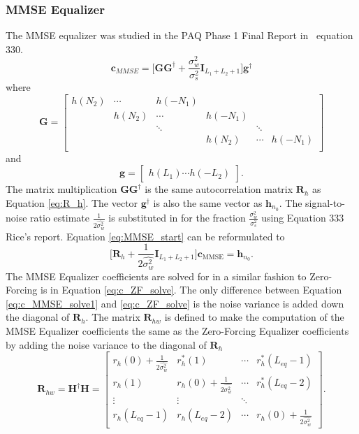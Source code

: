 \subsubsection{MMSE Equalizer}
The MMSE equalizer was studied in the PAQ Phase 1 Final Report in ~equation 330.
\begin{equation}
\mathbf{c}_{MMSE} = \big[ \mathbf{G}\mathbf{G}^\dagger + \frac{\sigma_w^2}{\sigma_s^2}\mathbf{I}_{L_1+L_2+1} \big] \mathbf{g}^\dagger
\label{eq:MMSE_start}
\end{equation}
where
\begin{equation}
\mathbf{G} = 
		\begin{bmatrix}
		h(N_2)		& \cdots	& h(-N_1) 	&  			\\
					& h(N_2)	& \cdots 	& h(-N_1)	\\
				 	& 			& \ddots 	&  			& \ddots	\\
		 			&  	   		&  			& h(N_2)	& \cdots	& h(-N_1)	\\
	\end{bmatrix}
\end{equation}
and
\begin{equation}
\mathbf{g} = \begin{bmatrix} h(L_1) \cdots h(-L_2) \end{bmatrix}.
\end{equation}
The matrix multiplication $\mathbf{G}\mathbf{G}^\dagger$ is the same autocorrelation matrix $\mathbf{R}_h$ as Equation \eqref{eq:R_h}.
The vector $\mathbf{g}^\dagger$ is also the same vector as $\mathbf{h}_{n_0}$.
The signal-to-noise ratio estimate $\frac{1}{2\hat{\sigma^2_w}}$ is substituted in for the fraction $\frac{\sigma_w^2}{\sigma_s^2}$ using Equation 333 Rice's report.
Equation \eqref{eq:MMSE_start} can be reformulated to
\begin{equation}
\big[ \mathbf{R}_h + \frac{1}{2\hat{\sigma^2_w}} \mathbf{I}_{L_1+L_2+1} \big] \mathbf{c}_\text{MMSE} = \mathbf{h}_{n_0}.
\label{eq:c_MMSE_solve1}
\end{equation}
The MMSE Equalizer coefficients are solved for in a similar fashion to Zero-Forcing is in Equation \eqref{eq:c_ZF_solve}.
The only difference between Equation \eqref{eq:c_MMSE_solve1} and \eqref{eq:c_ZF_solve} is the noise variance is added down the diagonal of $\mathbf{R}_h$.
The matrix $\mathbf{R}_{hw}$ is defined to make the computation of the MMSE Equalizer coefficients the same as the Zero-Forcing Equalizer coefficients by adding the noise variance to the diagonal of $\mathbf{R}_h$
\begin{equation}
\mathbf{R}_{hw} = 
\mathbf{H}^\dagger \mathbf{H} = 
		\begin{bmatrix}
		r_{h}(0) + \frac{1}{2\hat{\sigma^2_w}}	& r^\ast_{h}(1)							& \cdots 	& r^\ast_{h}(L_{eq}-1)  	\\
		r_{h}(1) 								& r_{h}(0) + \frac{1}{2\hat{\sigma^2_w}}& \cdots 	& r^\ast_{h}(L_{eq}-2)  	\\
		\vdots	 								& \vdots								& \ddots 	&  							\\
		r_{h}(L_{eq}-1)							& r_{h}(L_{eq}-2)						& \cdots	& r_{h}(0) + \frac{1}{2\hat{\sigma^2_w}}  			
	\end{bmatrix}.
	\label{eq:R_MMSE}
\end{equation}
